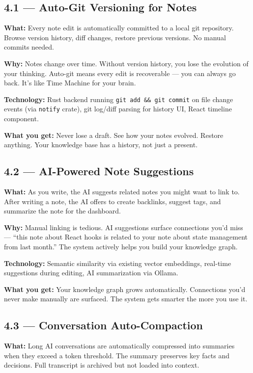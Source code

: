 \documentclass[11pt,a4paper]{article}
\begin{document}
\subsection{4.1 --- Auto-Git Versioning for Notes}

\textbf{What:} Every note edit is automatically committed to a local git repository. Browse version history, diff changes, restore previous versions. No manual commits needed.

\textbf{Why:} Notes change over time. Without version history, you lose the evolution of your thinking. Auto-git means every edit is recoverable --- you can always go back. It's like Time Machine for your brain.

\textbf{Technology:} Rust backend running \texttt{git add \&\& git commit} on file change events (via \texttt{notify} crate), git log/diff parsing for history UI, React timeline component.

\textbf{What you get:} Never lose a draft. See how your notes evolved. Restore anything. Your knowledge base has a history, not just a present.

\subsection{4.2 --- AI-Powered Note Suggestions}

\textbf{What:} As you write, the AI suggests related notes you might want to link to. After writing a note, the AI offers to create backlinks, suggest tags, and summarize the note for the dashboard.

\textbf{Why:} Manual linking is tedious. AI suggestions surface connections you'd miss --- ``this note about React hooks is related to your note about state management from last month.'' The system actively helps you build your knowledge graph.

\textbf{Technology:} Semantic similarity via existing vector embeddings, real-time suggestions during editing, AI summarization via Ollama.

\textbf{What you get:} Your knowledge graph grows automatically. Connections you'd never make manually are surfaced. The system gets smarter the more you use it.

\subsection{4.3 --- Conversation Auto-Compaction}

\textbf{What:} Long AI conversations are automatically compressed into summaries when they exceed a token threshold. The summary preserves key facts and decisions. Full transcript is archived but not loaded into context.
\end{document}
